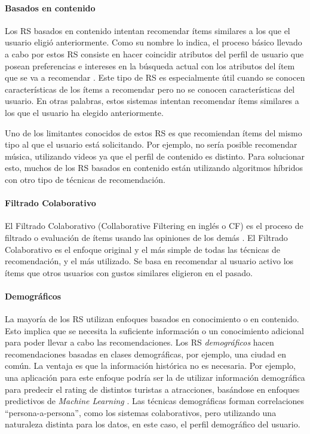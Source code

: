 \paragraph{Basados en contenido}
Los RS basados en contenido intentan recomendar ítems similares a los que el usuario eligió anteriormente. Como su nombre lo indica, el proceso básico llevado a cabo por estos RS consiste en hacer coincidir atributos del perfil de usuario que posean preferencias e intereses en la búsqueda actual con los atributos del ítem que se va a recomendar \citep{lops2011content}. Este tipo de RS es especialmente útil cuando se conocen características de los ítems a recomendar pero no se conocen características del usuario. En otras palabras, estos sistemas intentan recomendar ítems similares a los que el usuario ha elegido anteriormente.

\bigskip Uno de los limitantes conocidos de estos RS es que recomiendan ítems del mismo tipo al que el usuario está solicitando. Por ejemplo, no sería posible recomendar música, utilizando videos ya que el perfil de contenido es distinto. Para solucionar esto, muchos de los RS basados en contenido están utilizando algoritmos híbridos con otro tipo de técnicas de recomendación.

\paragraph{Filtrado Colaborativo}
El Filtrado Colaborativo (Collaborative Filtering en inglés o CF) es el proceso de filtrado o evaluación de ítems usando las opiniones de los demás \citep{schafer2007collaborative}. El Filtrado Colaborativo es el enfoque original y el más simple de todas las técnicas de recomendación, y el más utilizado. Se basa en recomendar al usuario activo los ítems que otros usuarios con gustos similares eligieron en el pasado.

\paragraph{Demográficos}
La mayoría de los RS utilizan enfoques basados en conocimiento o en contenido. Esto implica que se necesita la suficiente información o un conocimiento adicional para poder llevar a cabo las recomendaciones. Los RS \textit{demográficos} hacen recomendaciones basadas en clases demográficas, por ejemplo, una ciudad en común. La ventaja es que la información histórica no es necesaria. Por ejemplo, una aplicación para este enfoque podría ser la de utilizar información demográfica para predecir el rating de distintos turistas a atracciones, basándose en enfoques predictivos de \textit{Machine Learning} \citep{wang2012applicability}. Las técnicas demográficas forman correlaciones “persona-a-persona”, como los sistemas colaborativos, pero utilizando una naturaleza distinta para los datos, en este caso, el perfil demográfico del usuario.

